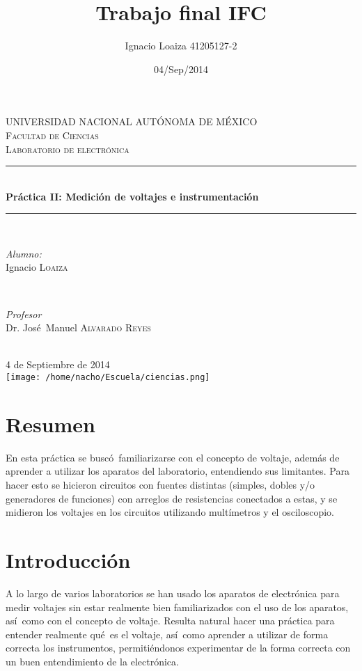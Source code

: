 \documentclass{article}
\title{Trabajo final IFC}
\author{Ignacio Loaiza   41205127-2}
\date{04/Sep/2014}
\begin{document}
\begin{titlepage}

\newcommand{\HRule}{\rule{\linewidth}{0.5mm}}
\center 
 
\textsc{\LARGE UNIVERSIDAD NACIONAL AUT\'ONOMA DE M\'EXICO}\\[1.5cm] 
\textsc{\Large Facultad de Ciencias}\\[0.5cm] 
\textsc{\large Laboratorio de electr\'onica}\\[0.5cm] 
\HRule \\[0.4cm]
{ \huge \bfseries Pr\'actica II: Medici\'on de voltajes e instrumentaci\'on}\\[0.4cm]
\HRule \\[1.5cm]
\begin{minipage}{0.4\textwidth}
\begin{flushleft} \large
\emph{Alumno:}\\
Ignacio \textsc{Loaiza}
\end{flushleft}
\end{minipage}
~
\begin{minipage}{0.4\textwidth}
\begin{flushright} \large
\emph{Profesor} \\
Dr. Jos\'e\ Manuel \textsc{Alvarado Reyes}
\end{flushright}
\end{minipage}\\[3cm]
{\large 4 de Septiembre de 2014}\\[0.5cm]
\texttt{[image: /home/nacho/Escuela/ciencias.png]}\\[1cm]
\vfill
\end{titlepage}


\section{Resumen}
En esta pr\'actica se busc\'o\ familiarizarse con el concepto de voltaje, adem\'as de aprender a utilizar los aparatos del laboratorio, entendiendo sus limitantes. Para hacer esto se hicieron circuitos con fuentes distintas (simples, dobles y/o generadores de funciones) con arreglos de resistencias conectados a estas, y se midieron los voltajes en los circuitos utilizando mult\'imetros y el osciloscopio.

\section{Introducci\'on}
A lo largo de varios laboratorios se han usado los aparatos de electr\'onica para medir voltajes sin estar realmente bien familiarizados con el uso de los aparatos, as\'i\ como con el concepto de voltaje. Resulta natural hacer una pr\'actica para entender realmente qu\'e\ es el voltaje, as\'i\ como aprender a utilizar de forma correcta los instrumentos, permiti\'endonos experimentar de la forma correcta con un buen entendimiento de la electr\'onica.
\end{document}
